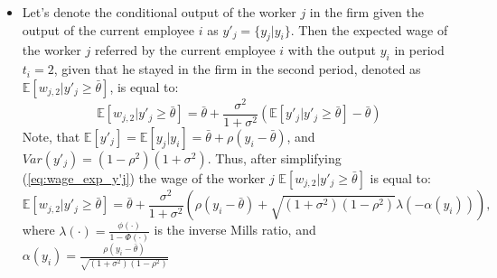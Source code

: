 \documentclass[12pt]{article}
\begin{document}
\begin{itemize}
    \item Let's denote the conditional output of the worker $j$ in the firm given the output of the current employee $i$ as $y'_j = \lbrace y_j | y_i \rbrace$. Then the expected wage of the worker $j$ referred by the current employee $i$ with the output $y_i$ in period $t_i = 2$, given that he stayed in the firm in the second period, denoted as $\mathbb{E}[w_{j,2}| y'_j  \geq \bar{\theta}]$, is equal to:
    \begin{equation}\label{eq:wage_exp_y'j}
        \mathbb{E}[w_{j,2}| y'_j \geq \bar{\theta}]= \bar{\theta} + \frac{\sigma^2}{1+\sigma^2}(\mathbb{E}[y'_j | y'_j \geq \bar{\theta}] - \bar{\theta})
    \end{equation}
    Note, that $\mathbb{E}[y'_j] = \mathbb{E}[y_j | y_i] = \bar{\theta} + \rho (y_i - \bar{\theta})$, and $Var(y'_j) = (1-\rho^2)(1+\sigma^2)$. Thus, after simplifying (\ref{eq:wage_exp_y'j}) the wage of the worker $j$ $\mathbb{E}[w_{j,2}|y'_j \geq \bar{\theta}]$ is equal to:
    \begin{equation}\label{eq:wage_j2_y_i}
        \mathbb{E}[w_{j,2}| y'_j \geq \bar{\theta}]= \bar{\theta} + \frac{\sigma^2}{1+\sigma^2} \left( \rho(y_i - \bar{\theta}) + \sqrt{(1+\sigma^2)(1-\rho^2)}\lambda \left( -\alpha(y_i) \right) \right),
    \end{equation}
    where $\lambda(\cdot) = \frac{\phi(\cdot)}{1-\Phi(\cdot)}$ is the inverse Mills ratio, and $\alpha(y_i) = \frac{\rho(y_i - \bar{\theta})}{\sqrt{(1+\sigma^2)(1-\rho^2)}}$
\end{itemize}
\end{document}
